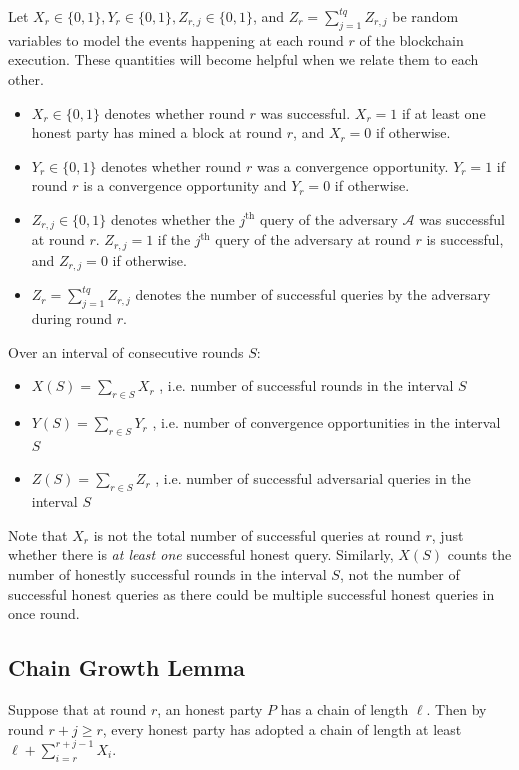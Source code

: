 Let $X_r \in \{0,1\}, Y_r \in \{0,1\}, Z_{r,j} \in \{0,1\}$, and $Z_r = \sum_{j=1}^{tq} Z_{r,j}$ be random variables to model the events happening at each round $r$ of the blockchain execution. These quantities will become helpful when we relate them to each other.
\begin{itemize}
    \item $X_r \in \{0, 1\}$ denotes whether round $r$ was successful. $X_r = 1$ if at least one honest party has mined a block at round $r$, and $X_r = 0$ if otherwise.
    \item $Y_r \in \{0, 1\}$ denotes whether round $r$ was a convergence opportunity. $Y_r = 1$ if round $r$ is a convergence opportunity and $Y_r = 0$ if otherwise.
    \item $Z_{r,j} \in \{0,1\}$ denotes whether the $j^\text{th}$ query of the adversary $\mathcal{A}$ was successful at round $r$. $Z_{r,j} = 1$ if the $j^\text{th}$ query of the adversary at round $r$ is successful, and $Z_{r,j} = 0$ if otherwise.
    \item $Z_r = \sum^{tq}_{j = 1} Z_{r,j}$ denotes the number of successful queries by the adversary during round $r$.
\end{itemize}

Over an interval of consecutive rounds $S$:
\begin{itemize}
\item $X(S) = \sum_{r\in S} X_r$ , i.e. number of successful rounds in the interval $S$
\item $Y(S) = \sum_{r\in S} Y_r$ , i.e. number of convergence opportunities in the interval $S$
\item $Z(S) = \sum_{r\in S} Z_r$ , i.e. number of successful adversarial queries in the interval $S$
\end{itemize}

Note that $X_r$ is not the total number of successful queries at round $r$, just whether there is \emph{at least one} successful honest query.
Similarly, $X(S)$ counts the number of honestly successful rounds in the interval $S$, not the number of successful honest queries as there could be multiple successful honest queries in once round.

\subsection{Chain Growth Lemma}

\begin {lemma}
    Suppose that at round $r$, an honest party $P$ has a chain of length $\ell$. Then by round $r + j \geq r$, every honest party has adopted a chain of length at least $\ell + \sum_{i=r}^{r + j - 1} X_i$.
\end {lemma}

